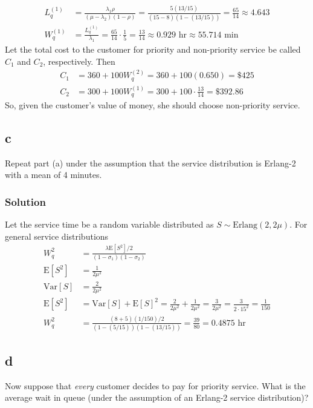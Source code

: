 \documentclass[letterpaper]{amsart}
\begin{document}
\begin{align*}
  L_q^{(1)} &=\frac{\lambda_1\rho}{(\mu-\lambda_2)(1-\rho)}=\frac{5(13/15)}{(15-8)(1-(13/15))}
             = \frac{65}{14} \approx 4.643 \\
  W_q^{(1)} &= \frac{L_q^{(1)}}{\lambda_1} = \frac{65}{14}\cdot\frac{1}{5}
              = \frac{13}{14} \approx 0.929\text{ hr}
              \approx 55.714\text{ min}
\end{align*}
Let the total cost to the customer for priority and non-priority service be called
$C_1$ and $C_2$, respectively. Then
\begin{align*}
  C_1 &= 360 + 100W_q^{(2)}= 360 + 100(0.650) = \$425 \\
  C_2 &= 300 + 100W_q^{(1)}= 300 + 100\cdot\frac{13}{14} = \$392.86
\end{align*}
So, given the customer's value of money, she should choose non-priority service.

\subsection*{c}
Repeat part (a) under the assumption that the service distribution is
Erlang-2 with a mean of 4 minutes.
\subsubsection*{Solution}
Let the service time be a random variable distributed as
$S\sim\text{Erlang}(2,2\mu)$. For general service distributions
\begin{align*}
W_q^{2}&=\frac{\lambda\text{E}[S^2]/2}{(1-\sigma_1)(1-\sigma_2)} \\
  \text{E}[S^2]&=\frac{1}{2\mu^2} \\
  \text{Var}[S] &= \frac{2}{2\mu^2} \\
  \text{E}[S^2]&=\text{Var}[S]+\text{E}[S]^2
                 = \frac{2}{2\mu^2} + \frac{1}{2\mu^2} = \frac{3}{2\mu^2}
                 = \frac{3}{2\cdot 15^2} = \frac{1}{150} \\
W_q^{2}&=\frac{(8+5)(1/150)/2}{(1-(5/15))(1-(13/15))}
         = \frac{39}{80} = 0.4875 \text{ hr}
\end{align*}

\subsection*{d}
Now suppose that \emph{every} customer decides to pay for priority service. What
is the average wait in queue (under the assumption of an Erlang-2 service
distribution)?
\end{document}
